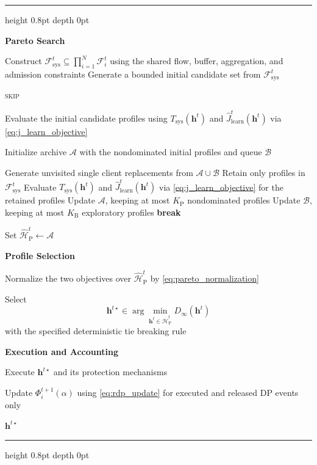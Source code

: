 \documentclass[5p,times]{elsarticle}
\makeatletter
\theoremstyle{plain}
\theoremstyle{definition}
\theoremstyle{remark}
\newenvironment{breakablealgorithm}
{%
  \par\addvspace{\intextsep}
  \refstepcounter{algorithm}%
  \hrule height 0.8pt depth 0pt
  \kern 2pt
  \renewcommand{\caption}[2][\relax]{%
    \noindent\textbf{\ALG@name~\thealgorithm}\ ##2\par
    \ifx\relax##1\relax
      \addcontentsline{loa}{algorithm}{\protect\numberline{\thealgorithm}##2}%
    \else
      \addcontentsline{loa}{algorithm}{\protect\numberline{\thealgorithm}##1}%
    \fi
    \kern 2pt
    \hrule height 0.8pt depth 0pt
    \kern 2pt
  }%
}
{%
  \kern 2pt
  \hrule height 0.8pt depth 0pt
  \par\addvspace{\intextsep}
}
\makeatother
\begin{document}
\begin{breakablealgorithm}
\begin{algorithmic}[1]
\STATE \textbf{Pareto Search}

\STATE Construct
\(\mathcal F_{\mathrm{sys}}^t\subseteq\prod_{i=1}^{N}\mathcal F_i^t\)
using the shared flow, buffer, aggregation, and admission constraints
\STATE Generate a bounded initial candidate set from
\(\mathcal F_{\mathrm{sys}}^t\)

    \RETURN \textsc{skip}
\ENDIF

\STATE Evaluate the initial candidate profiles using
\(T_{\mathrm{sys}}(\mathbf h^t)\) and \(\widehat J_{\mathrm{learn}}^t(\mathbf h^t)\) via \eqref{eq:j_learn_objective}

\STATE Initialize archive \(\mathcal A\) with the nondominated initial
profiles and queue \(\mathcal B\)

    \STATE Generate unvisited single client replacements from
    \(\mathcal A\cup\mathcal B\)
    \STATE Retain only profiles in \(\mathcal F_{\mathrm{sys}}^t\)
    \STATE Evaluate \(T_{\mathrm{sys}}(\mathbf h^t)\) and
    \(\widehat J_{\mathrm{learn}}^t(\mathbf h^t)\) via \eqref{eq:j_learn_objective} for the retained profiles
    \STATE Update \(\mathcal A\), keeping at most \(K_{\mathrm P}\)
    nondominated profiles
    \STATE Update \(\mathcal B\), keeping at most \(K_{\mathrm B}\)
    exploratory profiles
        \STATE \textbf{break}
    \ENDIF
\ENDFOR

\STATE Set \(\widehat{\mathcal H}_{\mathrm P}^t\leftarrow\mathcal A\)

\STATE \textbf{Profile Selection}

\STATE Normalize the two objectives over
\(\widehat{\mathcal H}_{\mathrm P}^t\) by
\eqref{eq:pareto_normalization}

\STATE Select
\[
\mathbf h^{t\star}\in
\arg\min_{\mathbf h^t\in\widehat{\mathcal H}_{\mathrm P}^t}
D_\infty(\mathbf h^t)
\]
with the specified deterministic tie breaking rule

\STATE \textbf{Execution and Accounting}

\STATE Execute \(\mathbf h^{t\star}\) and its protection mechanisms

\STATE Update \(\Phi_i^{t+1}(\alpha)\) using \eqref{eq:rdp_update} for
executed and released DP events only

\RETURN \(\mathbf h^{t\star}\)

\end{algorithmic}
\end{breakablealgorithm}
\end{document}
